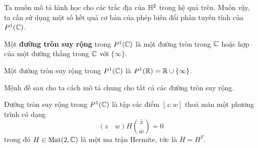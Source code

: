 Ta muốn mô tả hình học cho các trắc địa của $\mathbb{H}^2$ trong hệ quả trên. Muốn vậy, ta cần sử dụng một số kết quả cơ bản của phép biến đổi phân tuyến tính của $P^1(\mathbb{C})$.
\begin{defn}
    Một \textbf{đường tròn suy rộng} trong $P^1(\mathbb{C})$ là một đường tròn trong $\mathbb{C}$ hoặc hợp của một đường thẳng trong $\mathbb{C}$ với $\{\infty\}$.
\end{defn}
\begin{exam*}
    Một đường tròn suy rộng trong $P^1(\mathbb{C})$ là $P^1(\mathbb{R}) = \mathbb{R} \cup \{\infty\}$.
\end{exam*}
Mệnh đề sau cho ta cách mô tả chung cho tất cả các đường tròn suy rộng.
\begin{prop}\label{prop 2.2.7}
    Đường tròn suy rộng trong $P^1(\mathbb{C})$ là tập các điểm $[z:w]$ thoả mãn một phương trình có dạng
    \[(z\quad w)H\binom{\overline{z}}{\overline{w}} = 0\]
    trong đó $H \in \operatorname{Mat}(2,\mathbb{C})$ là một ma trận Hermite, tức là $\overline{H} = H^T$.
\end{prop}
